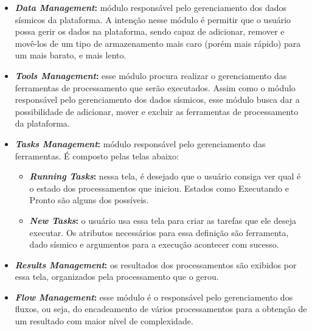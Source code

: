 \documentclass[11pt,twoside]{article}
\begin{document}
\begin{itemize}
  \item \textbf{\emph{Data Management}:} módulo responsável pelo gerenciamento dos dados sísmicos da plataforma. A intenção nesse módulo é permitir que o usuário possa
  gerir os dados na plataforma, sendo capaz de adicionar, remover e 
  movê-los de um tipo de armazenamento mais caro (porém mais rápido) para um mais barato, e mais lento. 
  \item \textbf{\emph{Tools Management}:} esse módulo procura realizar o gerenciamento das ferramentas de processamento que serão executados. Assim como o módulo responsável pelo gerenciamento
  dos dados sísmicos, esse módulo busca dar a possibilidade de adicionar, mover e excluir as ferramentas de processamento da plataforma.
  \item \textbf{\emph{Tasks Management}:} módulo responsável pelo gerenciamento das ferramentas. É composto pelas telas abaixo:
  \begin{itemize}
    \item \textbf{\emph{Running Tasks}:} nessa tela, é desejado que o usuário consiga ver qual é o estado dos processamentos que iniciou. Estados como Executando e Pronto são alguns dos 
    possíveis.
    \item \textbf{\emph{New Tasks}:} o usuário usa essa tela para criar as tarefas que ele deseja executar. Os atributos necessários para essa definição são ferramenta, dado sísmico 
    e argumentos para a execução acontecer com sucesso. 
  \end{itemize}
  \item \textbf{\emph{Results Management}:} os resultados dos processamentos são exibidos por essa tela, organizados pela processamento que o gerou.
  \item \textbf{\emph{Flow Management}:} esse módulo é o responsável pelo gerenciamento dos fluxos, ou seja, do encadeamento de vários processamentos para a obtenção de 
  um resultado com maior nível de complexidade.
\end{itemize}
\end{document}
